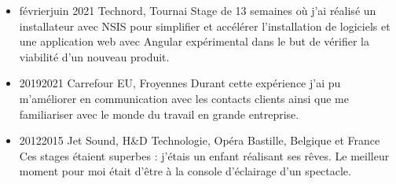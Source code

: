 \begin{itemize}
  \parskip=0.1em
  \item
  {février}{juin 2021}
  {Technord, Tournai}
  {Stage de 13 semaines où j’ai réalisé un installateur avec NSIS pour simplifier et accélérer l’installation de logiciels et une application web avec Angular expérimental dans le but de vérifier la viabilité d’un nouveau produit.}

  \item
  {2019}{2021}
  {Carrefour EU, Froyennes}
  {Durant cette expérience j'ai pu m'améliorer en communication avec les contacts clients ainsi que me familiariser avec le monde du travail en grande entreprise.}

  \item
  {2012}{2015}
  {Jet Sound, H\&D Technologie, Opéra Bastille, Belgique et France}
  {Ces stages étaient superbes : j'étais un enfant réalisant ses rêves. Le meilleur moment pour moi était d'être à la console d'éclairage d'un spectacle.}
\end{itemize}
